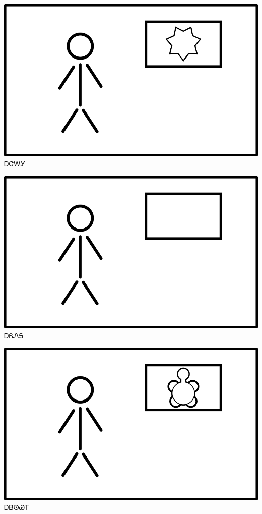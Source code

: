 \documentclass[avery5371]{flashcards}%
\begin{document}
\begin{flashcard}{
\includegraphics[width=0.95\columnwidth,height=.51\columnwidth,keepaspectratio]{../artwork/flags/ajalagi-flag}
}
\Huge ᎠᏣᎳᎩ
\end{flashcard}

\begin{flashcard}{
\includegraphics[width=0.95\columnwidth,height=.51\columnwidth,keepaspectratio]{../artwork/flags/ayonega-flag}
}
\Huge ᎠᏲᏁᎦ
\end{flashcard}

\begin{flashcard}{
\includegraphics[width=0.95\columnwidth,height=.51\columnwidth,keepaspectratio]{../artwork/flags/adaksi-flag}
}
\Huge ᎠᏴᏫᏯᎢ
\end{flashcard}
\end{document}
